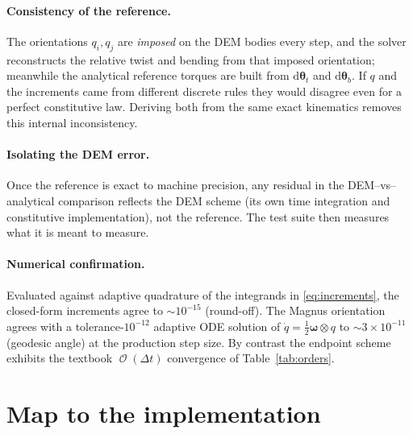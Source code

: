 \documentclass[11pt]{article}
\newcommand{\bw}{\boldsymbol{\omega}}
\newcommand{\Dt}{\Delta t}
\DeclareMathOperator{\Oo}{\mathcal{O}}
\begin{document}
\paragraph{Consistency of the reference.} The orientations $q_i,q_j$ are \emph{imposed} on
the DEM bodies every step, and the solver reconstructs the relative twist and bending from
that imposed orientation; meanwhile the analytical reference torques are built from
$\mathrm{d}\boldsymbol{\theta}_t$ and $\mathrm{d}\boldsymbol{\theta}_b$. If $q$ and the
increments came from different discrete rules they would disagree even for a perfect
constitutive law. Deriving both from the same exact kinematics removes this internal
inconsistency.

\paragraph{Isolating the DEM error.} Once the reference is exact to machine precision, any
residual in the DEM--vs--analytical comparison reflects the DEM scheme (its own time
integration and constitutive implementation), not the reference. The test suite then
measures what it is meant to measure.

\paragraph{Numerical confirmation.} Evaluated against adaptive quadrature of the integrands
in \eqref{eq:increments}, the closed-form increments agree to
$\sim\!10^{-15}$ (round-off). The Magnus orientation agrees with a tolerance-$10^{-12}$
adaptive ODE solution of $\dot q=\tfrac12\bw\otimes q$ to $\sim\!3\times10^{-11}$ (geodesic
angle) at the production step size. By contrast the endpoint scheme exhibits the textbook
$\Oo(\Dt)$ convergence of Table~\ref{tab:orders}.

\section{Map to the implementation}
\label{sec:impl}
\end{document}

